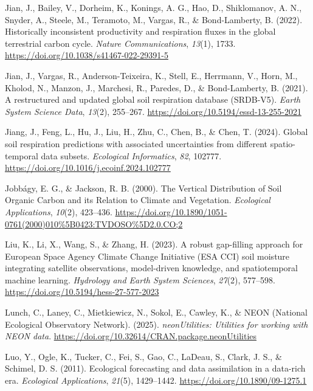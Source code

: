 \documentclass[
  letterpaper,
  DIV=11,
  numbers=noendperiod]{scrartcl}
\newlength{\cslhangindent}
\newenvironment{CSLReferences}[2] %
 {\begin{list}{}{%
  \setlength{\itemindent}{0pt}
  \setlength{\leftmargin}{0pt}
  \setlength{\parsep}{0pt}
  \ifodd #1
   \setlength{\leftmargin}{\cslhangindent}
   \setlength{\itemindent}{-1\cslhangindent}
  \fi
  \setlength{\itemsep}{#2\baselineskip}}}
 {\end{list}}
\begin{document}
\begin{CSLReferences}{1}{0}
Jian, J., Bailey, V., Dorheim, K., Konings, A. G., Hao, D., Shiklomanov,
A. N., Snyder, A., Steele, M., Teramoto, M., Vargas, R., \&
Bond-Lamberty, B. (2022). Historically inconsistent productivity and
respiration fluxes in the global terrestrial carbon cycle. \emph{Nature
Communications}, \emph{13}(1), 1733.
\url{https://doi.org/10.1038/s41467-022-29391-5}

Jian, J., Vargas, R., Anderson-Teixeira, K., Stell, E., Herrmann, V.,
Horn, M., Kholod, N., Manzon, J., Marchesi, R., Paredes, D., \&
Bond-Lamberty, B. (2021). A restructured and updated global soil
respiration database ({SRDB-V5}). \emph{Earth System Science Data},
\emph{13}(2), 255--267. \url{https://doi.org/10.5194/essd-13-255-2021}

Jiang, J., Feng, L., Hu, J., Liu, H., Zhu, C., Chen, B., \& Chen, T.
(2024). Global soil respiration predictions with associated
uncertainties from different spatio-temporal data subsets.
\emph{Ecological Informatics}, \emph{82}, 102777.
\url{https://doi.org/10.1016/j.ecoinf.2024.102777}

Jobbágy, E. G., \& Jackson, R. B. (2000). The {Vertical Distribution} of
{Soil Organic Carbon} and its {Relation} to {Climate} and {Vegetation}.
\emph{Ecological Applications}, \emph{10}(2), 423--436.
\url{https://doi.org/10.1890/1051-0761(2000)010\%5B0423:TVDOSO\%5D2.0.CO;2}

Liu, K., Li, X., Wang, S., \& Zhang, H. (2023). A robust gap-filling
approach for {European Space Agency Climate Change Initiative} ({ESA
CCI}) soil moisture integrating satellite observations, model-driven
knowledge, and spatiotemporal machine learning. \emph{Hydrology and
Earth System Sciences}, \emph{27}(2), 577--598.
\url{https://doi.org/10.5194/hess-27-577-2023}

Lunch, C., Laney, C., Mietkiewicz, N., Sokol, E., Cawley, K., \& NEON
(National Ecological Observatory Network). (2025). \emph{neonUtilities:
Utilities for working with NEON data}.
\url{https://doi.org/10.32614/CRAN.package.neonUtilities}

Luo, Y., Ogle, K., Tucker, C., Fei, S., Gao, C., LaDeau, S., Clark, J.
S., \& Schimel, D. S. (2011). Ecological forecasting and data
assimilation in a data-rich era. \emph{Ecological Applications},
\emph{21}(5), 1429--1442. \url{https://doi.org/10.1890/09-1275.1}


\end{CSLReferences}
\end{document}
